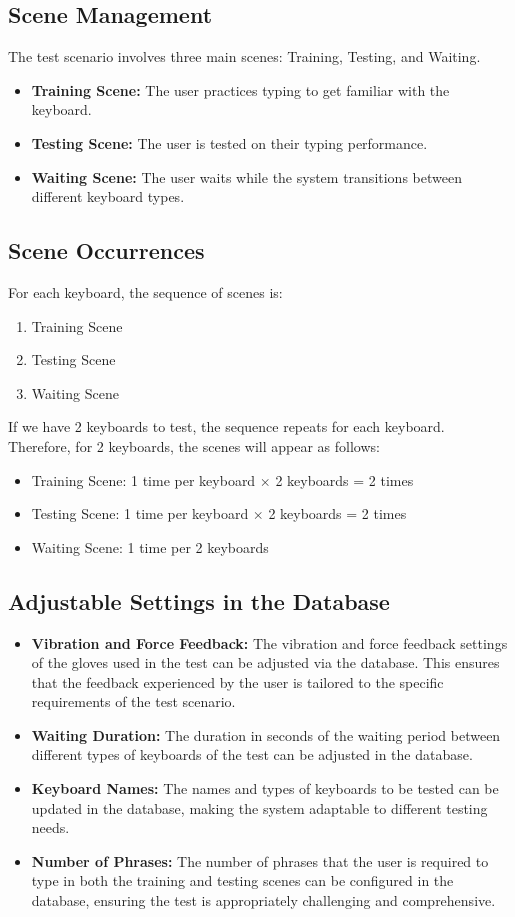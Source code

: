 \subsection{Scene Management}
The test scenario involves three main scenes: Training, Testing, and Waiting.
\begin{itemize}
    \item \textbf{Training Scene:} The user practices typing to get familiar with the keyboard.
    \item \textbf{Testing Scene:} The user is tested on their typing performance.
    \item \textbf{Waiting Scene:} The user waits while the system transitions between different keyboard types.
\end{itemize}

\subsection{Scene Occurrences}
For each keyboard, the sequence of scenes is:
\begin{enumerate}
    \item Training Scene
    \item Testing Scene
    \item Waiting Scene
\end{enumerate}

If we have 2 keyboards to test, the sequence repeats for each keyboard. Therefore, for 2 keyboards, the scenes will appear as follows:
\begin{itemize}
    \item Training Scene: 1 time per keyboard $\times$ 2 keyboards = 2 times
    \item Testing Scene: 1 time per keyboard $\times$ 2 keyboards = 2 times
    \item Waiting Scene: 1 time per 2 keyboards
\end{itemize}

\subsection{Adjustable Settings in the Database}
\begin{itemize}
    \item \textbf{Vibration and Force Feedback:} The vibration and force feedback settings of the gloves used in the test can be adjusted via the database. This ensures that the feedback experienced by the user is tailored to the specific requirements of the test scenario.
    \item \textbf{Waiting Duration:} The duration in seconds of the waiting period between different types of keyboards of the test can be adjusted in the database.
    \item \textbf{Keyboard Names:} The names and types of keyboards to be tested can be updated in the database, making the system adaptable to different testing needs.
    \item \textbf{Number of Phrases:} The number of phrases that the user is required to type in both the training and testing scenes can be configured in the database, ensuring the test is appropriately challenging and comprehensive.
\end{itemize}

